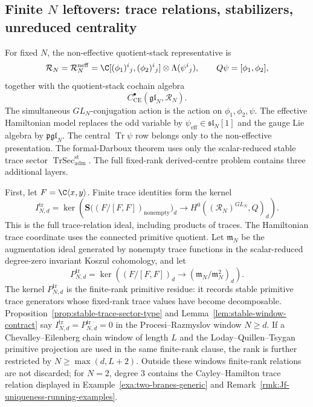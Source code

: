 \documentclass[11pt]{memoir}
\begin{document}
%
\subsection*{\texorpdfstring{Finite \(N\) leftovers: trace relations, stabilizers, unreduced centrality}{Finite N leftovers: trace relations, stabilizers, unreduced centrality}}
\label{ssec:finite-N-leftovers}

For fixed \(N\), the non-effective quotient-stack representative is
\[
  \mathcal R_N=\mathcal R_N^{\mathrm{neff}}=
  \C[(\phi_1)^i{}_j,(\phi_2)^i{}_j]\otimes\Lambda(\psi^i{}_j),
  \qquad Q\psi=[\phi_1,\phi_2],
\]
together with the quotient-stack cochain algebra
\[
  C^\bullet_{\mathrm{CE}}(\mathfrak{gl}_N,\mathcal R_N).
\]
The simultaneous \(GL_N\)-conjugation action is the action on
\(\phi_1,\phi_2,\psi\).  The effective Hamiltonian model replaces the
odd variable by \(\psi_{\mathrm{eff}}\in\mathfrak{sl}_N[1]\) and the
gauge Lie algebra by \(\mathfrak{pgl}_N\).  The central
\(\operatorname{Tr}\psi\) row belongs only to the non-effective
presentation.
The formal-Darboux theorem uses only the scalar-reduced stable trace
sector \(\operatorname{TrSec}^{\mathrm{st}}_{\mathrm{adm}}\).  The
full fixed-rank derived-centre problem contains three additional
layers.

First, let \(F=\C\langle x,y\rangle\).  Finite trace identities form
the kernel
\[
  I^{\mathrm{tr}}_{N,d}
  =
  \ker\!\left(
  \mathbf S\bigl((F/[F,F])_{\mathrm{nonempty}}\bigr)_d
  \longrightarrow
  H^0((\mathcal R_N)^{GL_N},Q)_d
  \right).
\]
This is the full trace-relation ideal, including products of traces.
The Hamiltonian trace coordinate uses the connected primitive quotient.
Let \(\mathfrak m_N\) be the augmentation ideal generated by nonempty
trace functions in the scalar-reduced degree-zero invariant Koszul
cohomology, and let
\[
  P^{\mathrm{tr}}_{N,d}
  =
  \ker\!\left(
  (F/[F,F])_d
  \longrightarrow
  (\mathfrak m_N/\mathfrak m_N^2)_d
  \right).
\]
The kernel \(P^{\mathrm{tr}}_{N,d}\) is the finite-rank primitive
residue: it records stable primitive trace generators whose fixed-rank
trace values have become decomposable.
Proposition~\ref{prop:stable-trace-sector-type} and
Lemma~\ref{lem:stable-window-contract} say
\(I^{\mathrm{tr}}_{N,d}=P^{\mathrm{tr}}_{N,d}=0\) in the
Procesi--Razmyslov window \(N\ge d\).  If a Chevalley--Eilenberg chain
window of length \(L\) and the Loday--Quillen--Tsygan primitive
projection are used in the same finite-rank clause, the rank is further
restricted by \(N\ge\max(d,L+2)\).  Outside these windows finite-rank
relations are not discarded; for \(N=2\), degree \(3\) contains the
Cayley--Hamilton trace relation displayed in
Example~\ref{exa:two-branes-generic} and
Remark~\ref{rmk:Jf-uniqueness-running-examples}.
\end{document}
